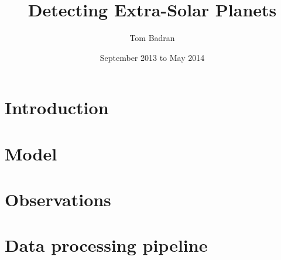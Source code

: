 \documentclass[a4paper]{article}
\title{Detecting Extra-Solar Planets}
\author{Tom Badran}
\date{September 2013 to May 2014}
\numberwithin{equation}{section}
\begin{document}
\maketitle

\tableofcontents
\listoffigures
\listoftables

\begin{abstract}

\end{abstract}

\section{Introduction}


\section{Model}


\section{Observations}


\section{Data processing pipeline}




\break
\appendix
{}


\end{document}
